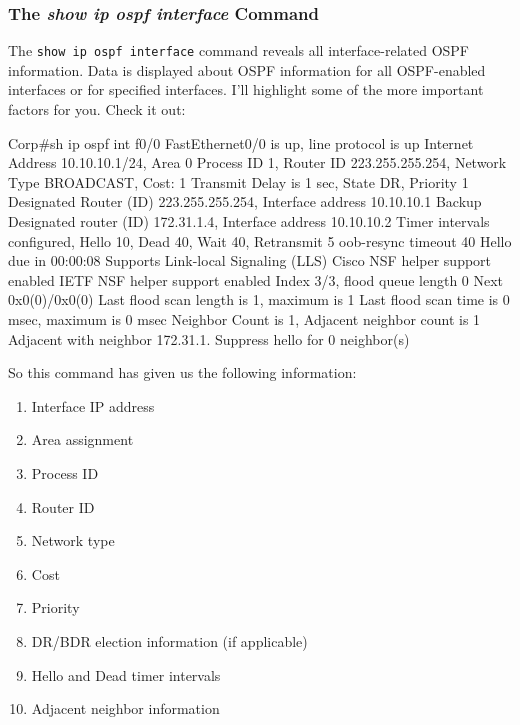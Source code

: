 \subsubsection[The \emph{show ip ospf interface}
Command]{\texorpdfstring{\protect\hypertarget{c18.xhtmlux5cux23c18-sec-14}{}{}The
\emph{show ip ospf interface}
Command}{The show ip ospf interface Command}}

The \texttt{show\ ip\ ospf\ interface} command reveals all
interface-related OSPF information. Data is displayed about OSPF
information for all OSPF-enabled interfaces or for specified interfaces.
I'll highlight some of the more important factors for you. Check it out:

\begin{cli}
Corp#sh ip ospf int f0/0
FastEthernet0/0 is up, line protocol is up
  Internet Address 10.10.10.1/24, Area 0
  Process ID 1, Router ID 223.255.255.254, Network Type BROADCAST, Cost: 1
  Transmit Delay is 1 sec, State DR, Priority 1
  Designated Router (ID) 223.255.255.254, Interface address 10.10.10.1
  Backup Designated router (ID) 172.31.1.4, Interface address 10.10.10.2
  Timer intervals configured, Hello 10, Dead 40, Wait 40, Retransmit 5
    oob-resync timeout 40
    Hello due in 00:00:08
  Supports Link-local Signaling (LLS)
  Cisco NSF helper support enabled
  IETF NSF helper support enabled
  Index 3/3, flood queue length 0
  Next 0x0(0)/0x0(0)
  Last flood scan length is 1, maximum is 1
  Last flood scan time is 0 msec, maximum is 0 msec
  Neighbor Count is 1, Adjacent neighbor count is 1
    Adjacent with neighbor 172.31.1.  Suppress hello for 0 neighbor(s)
\end{cli}

So this command has given us the following information:

\begin{enumerate}
\item
  Interface IP address
\item
  Area assignment
\item
  Process ID
\item
  Router ID
\item
  Network type
\item
  Cost
\item
  Priority
\item
  \protect\hypertarget{c18.xhtmlux5cux23Page_769}{}{}DR/BDR election
  information (if applicable)
\item
  Hello and Dead timer intervals
\item
  Adjacent neighbor information
\end{enumerate}


